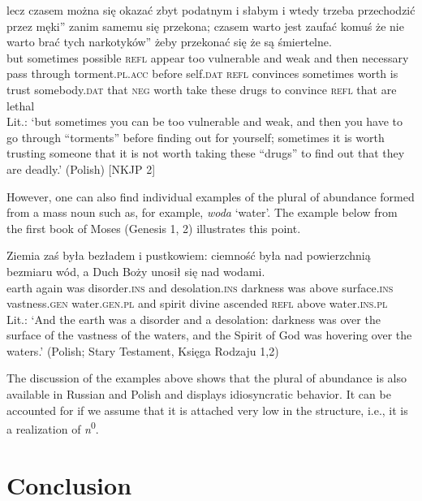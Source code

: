 \documentclass[output=paper,colorlinks,citecolor=brown]{langscibook}
\begin{document}
\ea\label{ex:geist:46}
\gll lecz czasem można się okazać zbyt podatnym i słabym i wtedy trzeba przechodzić przez  męki'' zanim samemu się przekona; czasem warto jest zaufać komuś że nie warto brać 	tych  narkotyków'' żeby przekonać się że są śmiertelne. \\
but sometimes possible \textsc{refl} appear too vulnerable and weak and then necessary pass through {} torment.\textsc{pl.acc} before self.\textsc{dat} \textsc{refl} convinces sometimes worth is trust somebody.\textsc{dat} that \textsc{neg} worth take these {} drugs to convince \textsc{refl} that are lethal \\
\glt Lit.: `but sometimes you can be too vulnerable and weak, and then you have to go through ``torments'' before finding out for yourself; sometimes it is worth trusting someone that it is not worth taking these ``drugs'' to find out that they are deadly.' \hfill (Polish) [NKJP 2]  
\z

\noindent However, one can also find individual examples of the plural of abundance formed from a mass noun such as, for example, \textit{woda} `water'. The example below from the first book of Moses (Genesis 1, 2) illustrates this point.

\ea\label{ex:geist:47}
\gll Ziemia zaś była bezładem i pustkowiem: ciemność była nad powierzchnią bezmiaru wód, a Duch Boży unosił się nad wodami. \\
earth again was disorder.\textsc{ins} and desolation.\textsc{ins} darkness was above surface.\textsc{ins} vastness.\textsc{gen} water.\textsc{gen.pl} and spirit divine ascended \textsc{refl} above water.\textsc{ins.pl} \\ 
\glt Lit.: `And the earth was a disorder and a desolation: darkness was over the surface of the vastness of the waters, and the Spirit of God was hovering over the waters.' \hfill (Polish; Stary Testament, Księga Rodzaju 1,2)  
\z

\noindent The discussion of the examples above shows that the plural of abundance is also available in Russian and Polish and displays idiosyncratic behavior. It can be accounted for if we assume that it is attached very low in the structure, i.e., it is a realization of \textit{n}\textsuperscript{0}.  


\section{Conclusion}\label{sec:geist:5}
\end{document}
